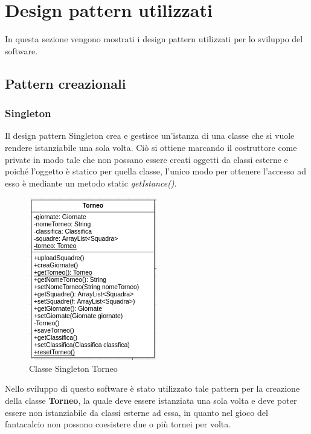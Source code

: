 \documentclass[12pt,a4paper]{article}
\begin{document}
\section{Design pattern utilizzati}
 In questa sezione vengono mostrati i design pattern utilizzati per lo sviluppo del software.
 \subsection{Pattern creazionali}
 \subsubsection{Singleton}
 Il design pattern Singleton crea e gestisce un'istanza di una classe che si vuole rendere istanziabile una sola volta. Ciò si ottiene marcando il costruttore come private in modo tale che non possano essere creati oggetti da classi esterne  e poiché l'oggetto è statico per quella classe, l'unico modo per ottenere l'accesso ad esso è  mediante  un metodo static \textit{getIstance()}.\\
 \begin{figure}[h]
\centering
\includegraphics[width=8 cm,keepaspectratio]{Singleton}
\caption{Classe Singleton Torneo}
\end{figure}
\newline
Nello sviluppo di  questo software è stato utilizzato tale pattern per la creazione della classe \textbf{Torneo}, la quale deve essere istanziata una sola volta e  deve poter essere non istanziabile da classi esterne ad essa, in quanto nel gioco del fantacalcio non possono coesistere due o più tornei per volta.
\newpage
\end{document}
